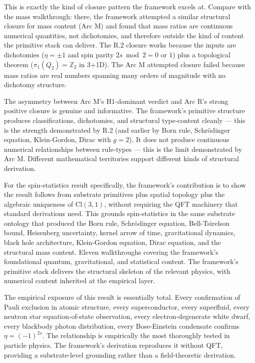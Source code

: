 \documentclass[11pt,a4paper]{article}
\begin{document}
This is exactly the kind of closure pattern the framework excels at. Compare with the mass walkthrough: there, the framework attempted a similar structural closure for mass content (Arc M) and found that mass ratios are continuous numerical quantities, not dichotomies, and therefore outside the kind of content the primitive stack can deliver. The R.2 closure works because the inputs are dichotomies ($\eta = \pm 1$ and spin parity $2s \bmod 2 = 0$ or $1$) plus a topological theorem ($\pi_1(Q_2) = \mathbb{Z}_2$ in 3+1D). The Arc M attempted closure failed because mass ratios are real numbers spanning many orders of magnitude with no dichotomy structure.

The asymmetry between Arc M's H1-dominant verdict and Arc R's strong positive closure is genuine and informative. The framework's primitive structure produces classifications, dichotomies, and structural type-content cleanly --- this is the strength demonstrated by R.2 (and earlier by Born rule, Schr\"odinger equation, Klein-Gordon, Dirac with $g = 2$). It does not produce continuous numerical relationships between rule-types --- this is the limit demonstrated by Arc M. Different mathematical territories support different kinds of structural derivation.

For the spin-statistics result specifically, the framework's contribution is to show the result follows from substrate primitives plus spatial topology plus the algebraic uniqueness of $\mathrm{Cl}(3,1)$, without requiring the QFT machinery that standard derivations need. This grounds spin-statistics in the same substrate ontology that produced the Born rule, Schr\"odinger equation, Bell-Tsirelson bound, Heisenberg uncertainty, kernel arrow of time, gravitational dynamics, black hole architecture, Klein-Gordon equation, Dirac equation, and the structural mass content. Eleven walkthroughs covering the framework's foundational quantum, gravitational, and statistical content. The framework's primitive stack delivers the structural skeleton of the relevant physics, with numerical content inherited at the empirical layer.

The empirical exposure of this result is essentially total. Every confirmation of Pauli exclusion in atomic structure, every superconductor, every superfluid, every neutron star equation-of-state observation, every electron-degenerate white dwarf, every blackbody photon distribution, every Bose-Einstein condensate confirms $\eta = (-1)^{2s}$. The relationship is empirically the most thoroughly tested in particle physics. The framework's derivation reproduces it without QFT, providing a substrate-level grounding rather than a field-theoretic derivation.
\end{document}
